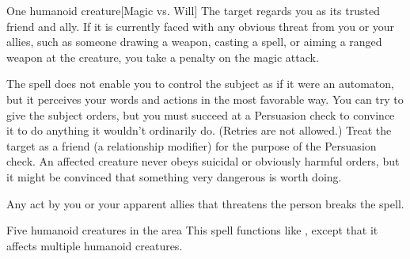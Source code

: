 \spellrng{\rngmed}
\spelldur{\durlong}
\begin{spelltarget}{One humanoid creature}[Magic vs. Will]
    \spellsuccess The target regards you as its trusted friend and ally. If it is currently faced with any obvious threat from you or your allies, such as someone drawing a weapon, casting a spell, or aiming a ranged weapon at the creature, you take a  penalty on the magic attack.
    \par The spell does not enable you to control the subject as if it were an automaton, but it perceives your words and actions in the most favorable way. You can try to give the subject orders, but you must succeed at a Persuasion check to convince it to do anything it wouldn't ordinarily do. (Retries are not allowed.) Treat the target as a friend (a  relationship modifier) for the purpose of the Persuasion check. An affected creature never obeys suicidal or obviously harmful orders, but it might be convinced that something very dangerous is worth doing.
\end{spelltarget}
\spellnotes Any act by you or your apparent allies that threatens the  person breaks the spell.

\norepeatnotes

\begin{spelltargets}{Five humanoid creatures in the area}
    \spellsuccess This spell functions like , except that it affects multiple humanoid creatures.
\end{spelltargets}

